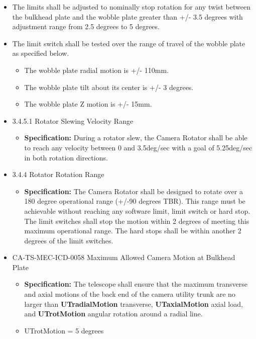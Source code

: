 \documentclass[SE,lsstdraft,authoryear,toc]{lsstdoc}
\begin{document}
\begin{itemize}
\item
  The limits shall be adjusted to nominally stop rotation for any twist
  between the bulkhead plate and the wobble plate greater than +/- 3.5
  degrees with adjustment range from 2.5 degrees to 5 degrees.
\item
  The limit switch shall be tested over the range of travel of the
  wobble plate as specified below.

  \begin{itemize}
  \item
    The wobble plate radial motion is +/- 110mm.
  \item
    The wobble plate tilt about its center is +/- 3 degrees.
  \item
    The wobble plate Z motion is +/- 15mm.
  \end{itemize}
\end{itemize}

\underline{}

\begin{itemize}
\item
  3.4.5.1 Rotator Slewing Velocity Range

  \begin{itemize}
  \item
    \textbf{Specification:} During a rotator slew, the Camera Rotator
    shall be able to reach any velocity between 0 and 3.5deg/sec with a
    goal of 5.25deg/sec in both rotation directions.
  \end{itemize}
\item
  3.4.4 Rotator Rotation Range

  \begin{itemize}
  \item
    \textbf{Specification:} The Camera Rotator shall be designed to
    rotate over a 180 degree operational range (+/-90 degrees TBR). This
    range must be achievable without reaching any software limit, limit
    switch or hard stop. The limit switches shall stop the motion within
    2 degrees of meeting this maximum operational range. The hard stops
    shall be within another 2 degrees of the limit switches.
  \end{itemize}
\end{itemize}

\underline{}

\begin{itemize}
\item
  CA-TS-MEC-ICD-0058 Maximum Allowed Camera Motion at Bulkhead Plate

  \begin{itemize}
  \item
    \textbf{Specification:} The telescope shall ensure that the maximum
    transverse and axial motions of the back end of the camera utility
    trunk are no larger than \textbf{UTradialMotion} transverse,
    \textbf{UTaxialMotion} axial load, and \textbf{UTrotMotion} angular
    rotation around a radial line.
  \item
    UTrotMotion = 5 degrees
  \end{itemize}
\end{itemize}
\end{document}

